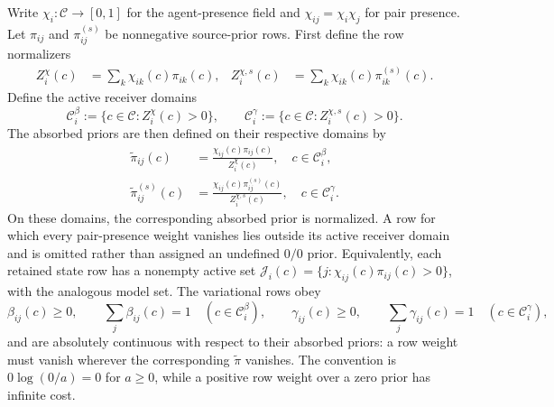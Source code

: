 Write \(\chi_i:\mathcal C\to[0,1]\) for the agent-presence field and \(\chi_{ij}=\chi_i\chi_j\) for pair presence. Let \(\pi_{ij}\) and \(\pi_{ij}^{(s)}\) be nonnegative source-prior rows. First define the row normalizers
\begin{align}
Z_i^{\chi}(c)
&=\sum_k\chi_{ik}(c)\pi_{ik}(c),
&
Z_i^{\chi,s}(c)
&=\sum_k\chi_{ik}(c)\pi_{ik}^{(s)}(c).
\label{eq:pifb2-row-normalizers}
\end{align}
Define the active receiver domains
\begin{equation}
\mathcal C_i^{\beta}
:=\{c\in\mathcal C:Z_i^{\chi}(c)>0\},
\qquad
\mathcal C_i^{\gamma}
:=\{c\in\mathcal C:Z_i^{\chi,s}(c)>0\}.
\label{eq:pifb2-active-receiver-domains}
\end{equation}
The absorbed priors are then defined on their respective domains by
\begin{align}
\widetilde\pi_{ij}(c)
&=\frac{\chi_{ij}(c)\pi_{ij}(c)}{Z_i^{\chi}(c)},
\quad c\in\mathcal C_i^{\beta},
\label{eq:pifb2-absorbed-state-prior}\\
\widetilde\pi_{ij}^{(s)}(c)
&=\frac{\chi_{ij}(c)\pi_{ij}^{(s)}(c)}{Z_i^{\chi,s}(c)},
\quad c\in\mathcal C_i^{\gamma}.
\label{eq:pifb2-absorbed-model-prior}
\end{align}
On these domains, the corresponding absorbed prior is normalized. A row for which every pair-presence weight vanishes lies outside its active receiver domain and is omitted rather than assigned an undefined \(0/0\) prior. Equivalently, each retained state row has a nonempty active set \(\mathcal J_i(c)=\{j:\chi_{ij}(c)\pi_{ij}(c)>0\}\), with the analogous model set. The variational rows obey
\begin{equation}
\beta_{ij}(c)\geq0,
\qquad
\sum_j\beta_{ij}(c)=1
\quad(c\in\mathcal C_i^{\beta}),
\qquad
\gamma_{ij}(c)\geq0,
\qquad
\sum_j\gamma_{ij}(c)=1
\quad(c\in\mathcal C_i^{\gamma}),
\label{eq:pifb2-row-simplexes}
\end{equation}
and are absolutely continuous with respect to their absorbed priors: a row weight must vanish wherever the corresponding \(\widetilde\pi\) vanishes. The convention is \(0\log(0/a)=0\) for \(a\geq0\), while a positive row weight over a zero prior has infinite cost.

